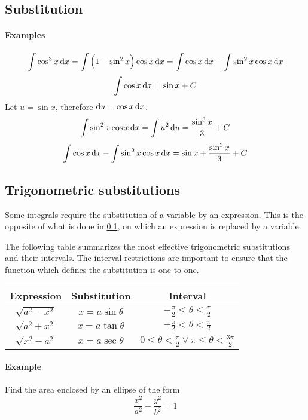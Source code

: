 \documentclass[12pt, oneside]{book}
\begin{document}
\subsection{Substitution}\label{substitution}
\paragraph{Examples}
\[\int \cos^3 x \dif x
= \int \left( 1 - \sin^2 x \right) \cos x \dif x
= \int \cos x \dif x - \int \sin^2 x \cos x \dif x\]
\[\int \cos x \dif x = \sin x + C\]
Let \(u = \sin x\), therefore \(\dif u = \cos x \dif x\).
\[\int \sin^2 x \cos x \dif x = \int u^2 \dif u = \frac{\sin^3 x}{3} + C\]
\[\int \cos x \dif x - \int \sin^2 x \cos x \dif x
= \sin x + \frac{\sin^3 x}{3} + C\]

\subsection{Trigonometric substitutions}
Some integrals require the substitution of a variable by an expression. This is
the opposite of what is done in \ref{substitution}, on which an expression is
replaced by a variable.

The following table summarizes the most effective trigonometric substitutions
and their intervals. The interval restrictions are important to ensure that the
function which defines the substitution is one-to-one. \cite{stewart}

\begin{center}
    \renewcommand{\arraystretch}{2}
    \begin{tabular}{ |c|c|c| }
        \hline
        Expression & Substitution & Interval \\
        \hline
        \(\sqrt{a^2 - x^2}\)
          & \(x = a\sin\theta\)
          & \(-\frac{\pi}{2} \le \theta \le \frac{\pi}{2}\) \\
        \hline
        \(\sqrt{a^2 + x^2}\)
          & \(x = a\tan\theta\)
          & \(-\frac{\pi}{2} < \theta < \frac{\pi}{2}\) \\
        \hline
        \(\sqrt{x^2 - a^2}\)
          & \(x = a\sec\theta\)
          & \(0 \le \theta < \frac{\pi}{2} \lor \pi \le \theta < \frac{3\pi}{2}\) \\
        \hline
    \end{tabular}
\end{center}

\paragraph{Example}
Find the area enclosed by an ellipse of the form
\[\frac{x^2}{a^2} + \frac{y^2}{b^2} = 1\]
\end{document}
